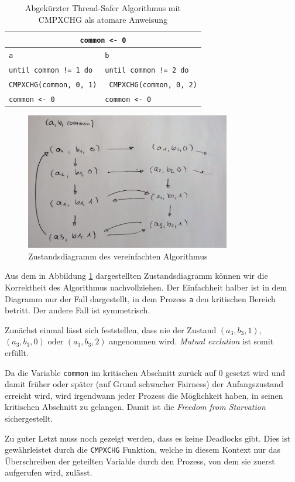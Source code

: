 \documentclass[a4paper,twoside,12pt,fleqn]{article}
\begin{document}
\begin{description}
\begin{table}[h]
\centering
\begin{tabularx}{0.75\textwidth}{l | l}
\multicolumn{2}{c}{\texttt{common <- 0}}\\
\hline
\texttt{a} & \texttt{b}\\
\hline
\texttt{until common != 1 do} & \texttt{until common != 2 do} \\
\texttt{\hspace{2em}CMPXCHG(common, 0, 1)} & \texttt{\hspace{2em} CMPXCHG(common, 0, 2)} \\
\texttt{common <- 0} & \texttt{common <- 0}\\
\end{tabularx}
\caption{Abgekürzter Thread-Safer Algorithmus mit CMPXCHG als atomare Anweisung}
\end{table}

\begin{figure}[htbp] 
  \centering
     \includegraphics[width=0.8\textwidth]{zustand.jpg}
  \caption{Zustandsdiagramm des vereinfachten Algorithmus}
  \label{zsd}
\end{figure}

Aus dem in Abbildung \ref{zsd} dargestellten Zustandsdiagramm können wir die Korrektheit des Algorithmus nachvollziehen. Der Einfachheit halber ist in dem Diagramm nur der Fall dargestellt, in dem Prozess \texttt{a} den kritischen Bereich betritt. Der andere Fall ist symmetrisch.

Zunächst einmal lässt sich feststellen, dass nie der Zustand $(a_3, b_3, 1)$, $(a_3, b_3, 0)$ oder $(a_3, b_3, 2)$ angenommen wird. \textit{Mutual exclution} ist somit erfüllt.

Da die Variable \texttt{common} im kritischen Abschnitt zurück auf $0$ gesetzt wird und damit früher oder später (auf Grund schwacher Fairness) der Anfangszustand erreicht wird, wird irgendwann jeder Prozess die Möglichkeit haben, in seinen kritischen Abschnitt zu gelangen. Damit ist die \textit{Freedom from Starvation} sichergestellt.

Zu guter Letzt muss noch gezeigt werden, dass es keine Deadlocks gibt. Dies ist gewährleistet durch die \texttt{CMPXCHG} Funktion, welche in diesem Kontext nur das Überschreiben der geteilten Variable durch den Prozess, von dem sie zuerst aufgerufen wird, zulässt.

\end{description}
\end{document}
